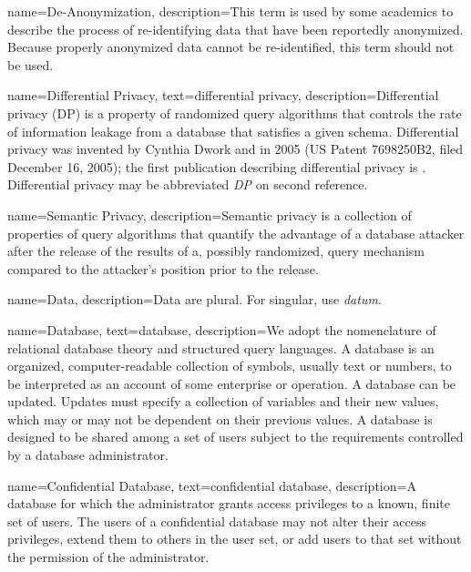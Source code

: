 {
    name=De-Anonymization,
    description={This term is used by some academics to describe the process of re-identifying data that have been reportedly anonymized. Because properly anonymized data cannot be re-identified, this term should not be used.}
}

{
    name=Differential Privacy,
    text=differential privacy,
    description={Differential privacy (DP) is a property of randomized query algorithms that controls the rate of information leakage from a database that satisfies a given schema. Differential privacy was invented by Cynthia Dwork and  in 2005 (US Patent 7698250B2, filed December 16, 2005); the first publication describing differential privacy is \textcite{dwork_calibrating_2006} \parencite[see also][]{dwork_calibrating_2016}. Differential privacy may be abbreviated \emph{DP} on second reference.}
}

{
    name=Semantic Privacy,
    description={Semantic privacy is a collection of properties of query algorithms that quantify the advantage of a database attacker after the release of the results of a, possibly randomized, query mechanism compared to the attacker's position prior to the release.}
}

{
    name=Data,
    description={Data are plural. For singular, use \emph{datum}.}
}

{
    name=Database,
    text=database,
    description={We adopt the nomenclature of relational database theory and structured query languages. A database is an organized, computer-readable collection of symbols, usually text or numbers, to be interpreted as an account of some enterprise or operation. A database can be updated. Updates must specify a collection of variables and their new values, which may or may not be dependent on their previous values. A database is designed to be shared among a set of users subject to the requirements controlled by a database administrator.}
}

{
    name=Confidential Database,
    text=confidential database,
    description={A database for which the administrator grants access privileges to a known, finite set of users. The users of a confidential database may not alter their access privileges, extend them to others in the user set, or add users to that set without the permission of the administrator.}
}

